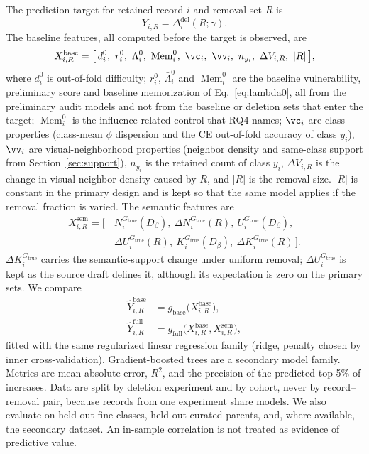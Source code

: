 \documentclass{article} %
\newcommand{\cn}[1]{\textsc{#1}}
\newcommand{\Gtrue}{G_{\mathrm{true}}}
\newcommand{\Mem}{\operatorname{Mem}}
\begin{document}
The prediction target for retained record $i$ and removal set $R$ is
\begin{equation}
Y_{i,R}=\Delta_i^{\mathrm{del}}(R;\gamma).
\label{eq:target}
\end{equation}
The baseline features, all computed before the target is observed, are
\begin{equation}
X_{i,R}^{\mathrm{base}}=\big[\,d_i^0,\ r_i^0,\ \bar\Lambda_i^0,\ \Mem_i^0,\ \vc_i,\ \vv_i,\ n_{y_i},\ \Delta V_{i,R},\ |R|\,\big],
\label{eq:xbase}
\end{equation}
where $d_i^0$ is out-of-fold difficulty; $r_i^0$, $\bar\Lambda_i^0$ and $\Mem_i^0$ are the baseline vulnerability, preliminary score and baseline memorization of Eq.~\ref{eq:lambda0}, all from the preliminary audit models and not from the baseline or deletion sets that enter the target; $\Mem_i^0$ is the influence-related control that RQ4 names; $\vc_i$ are class properties (class-mean $\bar\phi$ dispersion and the \cn{CE} out-of-fold accuracy of class $y_i$), $\vv_i$ are visual-neighborhood properties (neighbor density and same-class support from Section~\ref{sec:support}), $n_{y_i}$ is the retained count of class $y_i$, $\Delta V_{i,R}$ is the change in visual-neighbor density caused by $R$, and $|R|$ is the removal size. $|R|$ is constant in the primary design and is kept so that the same model applies if the removal fraction is varied. The semantic features are
\begin{equation}
\begin{aligned}
X_{i,R}^{\mathrm{sem}}=\big[\,&N_i^{\Gtrue}(D_\beta),\ \Delta N_i^{\Gtrue}(R),\ U_i^{\Gtrue}(D_\beta),\\
&\Delta U_i^{\Gtrue}(R),\ K_i^{\Gtrue}(D_\beta),\ \Delta K_i^{\Gtrue}(R)\,\big].
\end{aligned}
\label{eq:xsem}
\end{equation}
$\Delta K_i^{\Gtrue}$ carries the semantic-support change under uniform removal; $\Delta U_i^{\Gtrue}$ is kept as the source draft defines it, although its expectation is zero on the primary sets.
We compare
\begin{align}
\hat Y_{i,R}^{\mathrm{base}}&=g_{\mathrm{base}}\big(X_{i,R}^{\mathrm{base}}\big), \label{eq:gbase}\\
\hat Y_{i,R}^{\mathrm{full}}&=g_{\mathrm{full}}\big(X_{i,R}^{\mathrm{base}},X_{i,R}^{\mathrm{sem}}\big), \label{eq:gfull}
\end{align}
fitted with the same regularized linear regression family (ridge, penalty chosen by inner cross-validation). Gradient-boosted trees are a secondary model family. Metrics are mean absolute error, $R^2$, and the precision of the predicted top 5\% of increases. Data are split by deletion experiment and by cohort, never by record--removal pair, because records from one experiment share models. We also evaluate on held-out fine classes, held-out curated parents, and, where available, the secondary dataset. An in-sample correlation is not treated as evidence of predictive value.
\end{document}
